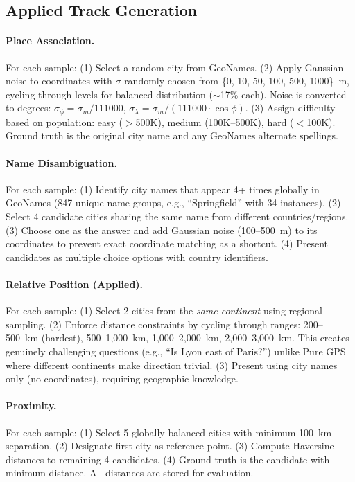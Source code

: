 \subsection{Applied Track Generation}

\paragraph{Place Association.}
For each sample: (1) Select a random city from GeoNames. (2) Apply Gaussian noise to coordinates with $\sigma$ randomly chosen from \{0, 10, 50, 100, 500, 1000\}~m, cycling through levels for balanced distribution ($\sim$17\% each). Noise is converted to degrees: $\sigma_\phi = \sigma_m / 111000$, $\sigma_\lambda = \sigma_m / (111000 \cdot \cos\phi)$. (3) Assign difficulty based on population: easy ($>$500K), medium (100K--500K), hard ($<$100K). Ground truth is the original city name and any GeoNames alternate spellings.

\paragraph{Name Disambiguation.}
For each sample: (1) Identify city names that appear 4+ times globally in GeoNames (847 unique name groups, e.g., ``Springfield'' with 34 instances). (2) Select 4 candidate cities sharing the same name from different countries/regions. (3) Choose one as the answer and add Gaussian noise (100--500~m) to its coordinates to prevent exact coordinate matching as a shortcut. (4) Present candidates as multiple choice options with country identifiers.

\paragraph{Relative Position (Applied).}
For each sample: (1) Select 2 cities from the \textit{same continent} using regional sampling. (2) Enforce distance constraints by cycling through ranges: 200--500~km (hardest), 500--1,000~km, 1,000--2,000~km, 2,000--3,000~km. This creates genuinely challenging questions (e.g., ``Is Lyon east of Paris?'') unlike Pure GPS where different continents make direction trivial. (3) Present using city names only (no coordinates), requiring geographic knowledge.

\paragraph{Proximity.}
For each sample: (1) Select 5 globally balanced cities with minimum 100~km separation. (2) Designate first city as reference point. (3) Compute Haversine distances to remaining 4 candidates. (4) Ground truth is the candidate with minimum distance. All distances are stored for evaluation.

